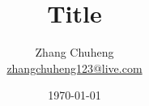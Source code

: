 \documentclass[CHN]{Sketch}
\title{Title}
\author{Zhang Chuheng \\ \href{mailto:zhangchuheng123@live.com}{zhangchuheng123@live.com}}
\date{\today}
\begin{document}
 
\maketitle

\cite{李茂昌1991汽车尾气催化剂}



\end{document}
